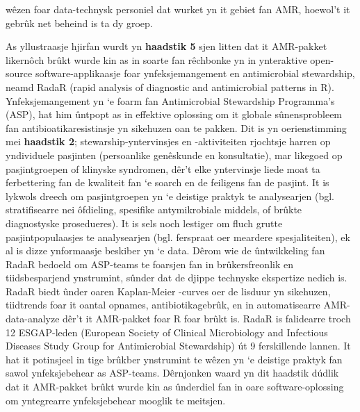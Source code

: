 \documentclass[
]{book}
\begin{document}
wêzen foar data-technysk personiel dat wurket yn it gebiet fan AMR, hoewol't it gebrûk net beheind is ta dy groep.

As yllustraasje hjirfan wurdt yn \textbf{haadstik 5} sjen litten dat it AMR-pakket likernôch brûkt wurde kin as in soarte fan rêchbonke yn in ynteraktive open-source software-applikaasje foar ynfeksjemangement en antimicrobial stewardship, neamd RadaR (rapid analysis of diagnostic and antimicrobial patterns in R). Ynfeksjemangement yn `e foarm fan Antimicrobial Stewardship Programma's (ASP), hat him ûntpopt as in effektive oplossing om it globale sûnensprobleem fan antibioatikaresistinsje yn sikehuzen oan te pakken. Dit is yn oerienstimming mei \textbf{haadstik 2}; stewarship-yntervinsjes en -aktiviteiten rjochtsje harren op yndividuele pasjinten (persoanlike genêskunde en konsultatie), mar likegoed op pasjintgroepen of klinyske syndromen, dêr't elke yntervinsje liede moat ta ferbettering fan de kwaliteit fan `e soarch en de feiligens fan de pasjint. It is lykwols dreech om pasjintgroepen yn `e deistige praktyk te analysearjen (bgl. stratifisearre nei ôfdieling, spesifike antymikrobiale middels, of brûkte diagnostyske prosedueres). It is sels noch lestiger om fluch grutte pasjintpopulaasjes te analysearjen (bgl. ferspraat oer meardere spesjaliteiten), ek al is dizze ynformaasje beskiber yn `e data. Dêrom wie de ûntwikkeling fan RadaR bedoeld om ASP-teams te foarsjen fan in brûkersfreonlik en tiidsbesparjend ynstrumint, sûnder dat de djippe technyske ekspertize nedich is. RadaR biedt ûnder oaren Kaplan-Meier -curves oer de lisduur yn sikehuzen, tiidtrends foar it oantal opnames, antibiotikagebrûk, en in automatisearre AMR-data-analyze dêr't it AMR-pakket foar R foar brûkt is. RadaR is falidearre troch 12 ESGAP-leden (European Society of Clinical Microbiology and Infectious Diseases Study Group for Antimicrobial Stewardship) út 9 ferskillende lannen. It hat it potinsjeel in tige brûkber ynstrumint te wêzen yn `e deistige praktyk fan sawol ynfeksjebehear as ASP-teams. Dêrnjonken waard yn dit haadstik dúdlik dat it AMR-pakket brûkt wurde kin as ûnderdiel fan in oare software-oplossing om yntegrearre ynfeksjebehear mooglik te meitsjen.
\end{document}
